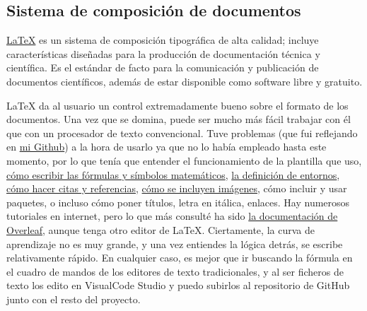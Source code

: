 \subsection{Sistema de composición de documentos}
\href{https://www.latex-project.org/}{LaTeX} es un sistema de composición tipográfica de alta calidad; 
incluye características diseñadas para la producción de documentación técnica y científica. Es el estándar 
de facto para la comunicación y publicación de documentos científicos, además de estar disponible como 
software libre y gratuito. 

LaTeX da al usuario un control extremadamente bueno sobre el formato de los documentos. Una vez que se 
domina, puede ser mucho más fácil trabajar con él que con un procesador de texto convencional. Tuve 
problemas (que fui reflejando en \href{https://github.com/ElenaMerelo/TFG/issues}{mi Github}) a la hora 
de usarlo ya que no lo había empleado hasta este momento, por lo que tenía que entender 
el funcionamiento de la plantilla que uso, \href{https://github.com/ElenaMerelo/TFG/issues/58}{cómo escribir las fórmulas 
y símbolos matemáticos}, \href{https://github.com/ElenaMerelo/TFG/issues/54}{la definición de entornos}, 
\href{https://github.com/ElenaMerelo/TFG/issues/56}{cómo hacer citas y referencias}, 
\href{https://github.com/ElenaMerelo/TFG/issues/57}{cómo se incluyen imágenes}, cómo incluir y usar paquetes, o incluso cómo poner títulos, letra 
en itálica, enlaces. Hay numerosos tutoriales en internet, pero lo que más consulté ha sido
 \href{https://es.overleaf.com/learn}{la documentación de Overleaf}, aunque tenga otro editor de LaTeX. Ciertamente, 
 la curva de aprendizaje no es muy grande, y una vez entiendes la lógica detrás, se escribe relativamente rápido. En 
 cualquier caso, es mejor que ir buscando la fórmula en el cuadro de mandos de los editores de texto tradicionales, 
 y al ser ficheros de texto los edito en VisualCode Studio y puedo subirlos al repositorio de GitHub junto con el resto 
 del proyecto. 

